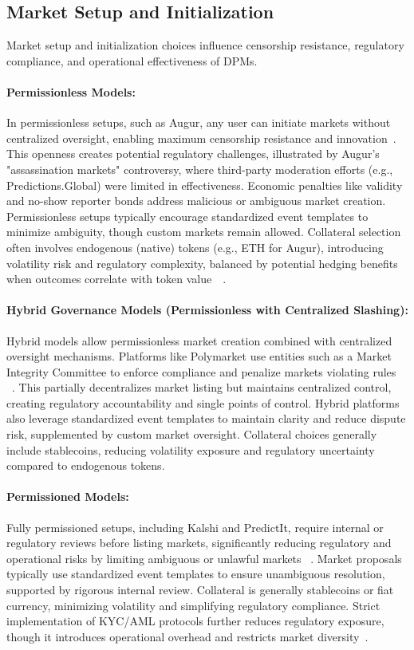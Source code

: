 {\subsection{Market Setup and Initialization}\label{subsec:market_setup_init}
Market setup and initialization choices influence censorship resistance, regulatory compliance, and operational effectiveness of DPMs.

\paragraph{Permissionless Models:} In permissionless setups, such as Augur, any user can initiate markets without centralized oversight, enabling maximum censorship resistance and innovation~\cite{Du19}. This openness creates potential regulatory challenges, illustrated by Augur's "assassination markets" controversy, where third-party moderation efforts (e.g., Predictions.Global) were limited in effectiveness. Economic penalties like validity and no-show reporter bonds address malicious or ambiguous market creation. Permissionless setups typically encourage standardized event templates to minimize ambiguity, though custom markets remain allowed. Collateral selection often involves endogenous (native) tokens (e.g., ETH for Augur), introducing volatility risk and regulatory complexity, balanced by potential hedging benefits when outcomes correlate with token value~\cite{AKPWZ19}~\cite{Sz15}.

\paragraph{Hybrid Governance Models (Permissionless with Centralized Slashing):} Hybrid models allow permissionless market creation combined with centralized oversight mechanisms. Platforms like Polymarket use entities such as a Market Integrity Committee to enforce compliance and penalize markets violating rules~\cite{ClEsGS21} ~\cite{Du19}. This partially decentralizes market listing but maintains centralized control, creating regulatory accountability and single points of control. Hybrid platforms also leverage standardized event templates to maintain clarity and reduce dispute risk, supplemented by custom market oversight. Collateral choices generally include stablecoins, reducing volatility exposure and regulatory uncertainty compared to endogenous tokens.

\paragraph{Permissioned Models:} Fully permissioned setups, including Kalshi and PredictIt, require internal or regulatory reviews before listing markets, significantly reducing regulatory and operational risks by limiting ambiguous or unlawful markets ~\cite{BCFKMN14}. Market proposals typically use standardized event templates to ensure unambiguous resolution, supported by rigorous internal review. Collateral is generally stablecoins or fiat currency, minimizing volatility and simplifying regulatory compliance. Strict implementation of KYC/AML protocols further reduces regulatory exposure, though it introduces operational overhead and restricts market diversity~\cite{Du19}.

}
